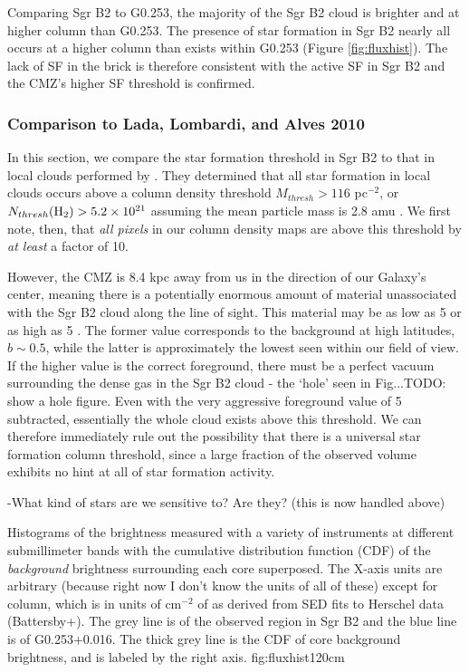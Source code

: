 \documentclass{emulateapj}
\begin{document}
Comparing Sgr B2 to G0.253, the majority of the Sgr B2 cloud is brighter and at
higher column than G0.253.  The presence of star formation in Sgr B2 nearly all
occurs at a higher column than exists within G0.253 (Figure
\ref{fig:fluxhist}).  The lack of SF in the brick is therefore consistent with
the active SF in Sgr B2 and the CMZ's higher SF threshold is confirmed.

\subsubsection{Comparison to Lada, Lombardi, and Alves 2010}
In this section, we compare the star formation threshold in Sgr B2 to that in
local clouds performed by \citet{Lada2010a}.  They determined that all star
formation in local clouds occurs above a column density threshold $M_{thresh} >
116$ \msun pc$^{-2}$, or $N_{thresh}(\textrm{H}_{2}) > 5.2\times10^{21}$ \persc assuming the
mean particle mass is 2.8 amu \citep{Kauffmann2008a}.  We first note, then,
that \emph{all pixels} in our column density maps are above this threshold
by \emph{at least} a factor of 10.

However, the CMZ is 8.4 kpc away from us in the direction of our Galaxy's
center, meaning there is a potentially enormous amount of material unassociated
with the Sgr B2 cloud along the line of sight.  This material may be as low as
5 \persc or as high as 5 \persc.  The former value corresponds to
the background at high latitudes, $b\sim0.5$, while the latter  is
approximately the lowest seen within our field of view.  If the higher value is the 
correct foreground, there must be a perfect vacuum surrounding the dense gas in
the Sgr B2 cloud - the `hole' seen in Fig...TODO: show a hole figure.
Even with the very aggressive foreground value of 5 \persc subtracted,
essentially the whole cloud exists above this threshold.  We can therefore
immediately rule out the possibility that there is a universal star formation
column threshold, since a large fraction of the observed volume exhibits
no hint at all of star formation activity.

-What kind of stars are we sensitive to?  Are they?
(this is now handled above)


{Histograms of the brightness measured with a variety of instruments at
different submillimeter bands with the cumulative distribution function (CDF)
of the \emph{background} brightness surrounding each core superposed.  The
X-axis units are arbitrary (because right now I don't know the units of all of
these) except for column, which is in units of cm$^{-2}$ of \hh as derived from
SED fits to Herschel data (Battersby+).  The grey line is of the observed
region in Sgr B2 and the blue line is of G0.253+0.016.  The thick grey line is
the CDF of core background brightness, and is labeled by the right axis.}
{fig:fluxhist}{1}{20cm}




\end{document}
